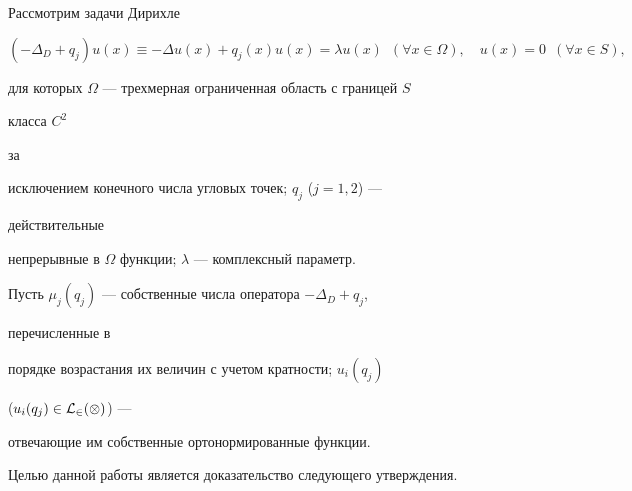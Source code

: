 \pagestyle{plain} %


 




\maketitle 


\label{begin} 


 


 


Рассмотрим задачи Дирихле 


$$


(-\Delta_D+q_j)u(x)\equiv-\Delta u(x)+ 


q_j(x)u(x)=\lambda u(x) \ \; (\forall x\in \Omega),\quad


u(x)=0 \ \; (\forall x\in S), 


$$


для которых $\Omega$ --- трехмерная ограниченная область с границей $S$ 


класса $C^2$ 


за 


исключением конечного числа угловых точек; $q_j$ ($j=1,2$) --- 


действительные 


непрерывные в $\Omega$ функции; $\lambda$ --- комплексный параметр. 


 


Пусть $\mu_j(q_j)$ --- собственные числа оператора $-\Delta_D+q_j$, 


перечисленные в 


порядке возрастания их величин с учетом кратности; $u_i(q_j)$ 


($u_i(q_j)\in\cal L_2(\Omega)$) --- 


отвечающие им собственные ортонормированные функции. 


 


Целью данной работы является доказательство следующего утверждения. 


 


